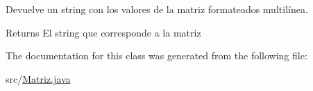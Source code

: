 Devuelve un string con los valores de la matriz formateados multilínea. 

\begin{DoxyReturn}{Returns}
El string que corresponde a la matriz 
\end{DoxyReturn}


The documentation for this class was generated from the following file\-:\begin{DoxyCompactItemize}
\item 
src/\hyperlink{Matriz_8java}{Matriz.\-java}\end{DoxyCompactItemize}
